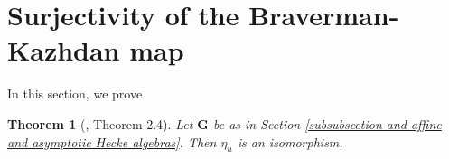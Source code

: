 \documentclass[10pt]{article}
\newcommand{\pair}[2]{\left\langle #1 , #2\right\rangle}
\newcommand{\dInt}[2]{\int {#1} \,\mathrm{d} {#2}}
\newcommand{\trace}[2]{\mathrm{trace}\left({#1}\,,{#2}\right)}
\newcommand{\G}{\mathbf{G}}
\newtheorem{theorem}{Theorem}
\theoremstyle{definition}
\theoremstyle{remark}
\begin{document}
%
%
\section{Surjectivity of the Braverman-Kazhdan map}
\label{section surjectivity}
%
In this section, we prove
% 
\begin{theorem}[\cite{BK}, Theorem 2.4]
\label{thm BK onto}
Let $\G$ be as in Section \ref{subsubsection and affine and asymptotic Hecke algebras}. Then $\eta_u$ is an isomorphism.
\end{theorem}
%
\end{document}
